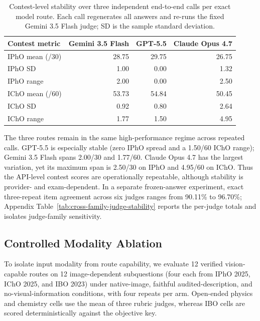 \documentclass[11pt]{article}
\begin{document}
\begin{table}[t]
\centering
\scriptsize
\setlength{\tabcolsep}{4.2pt}
\begin{tabular}{l r r r}
\toprule
\textbf{Contest metric} & \textbf{Gemini 3.5 Flash} & \textbf{GPT-5.5} & \textbf{Claude Opus 4.7} \\
\midrule
IPhO mean (/30) & 28.75 & 29.75 & 26.75 \\
IPhO SD & 1.00 & 0.00 & 1.32 \\
IPhO range & 2.00 & 0.00 & 2.50 \\
\midrule
IChO mean (/60) & 53.73 & 54.84 & 50.45 \\
IChO SD & 0.92 & 0.80 & 2.64 \\
IChO range & 1.77 & 1.50 & 4.95 \\
\bottomrule
\end{tabular}
\caption{Contest-level stability over three independent end-to-end calls per exact model route. Each call regenerates all answers and re-runs the fixed Gemini 3.5 Flash judge; SD is the sample standard deviation.}
\label{tab:fresh-2026-run-stability}
\vspace{-0.3cm}
\end{table}

The three routes remain in the same high-performance regime across repeated calls. GPT-5.5 is especially stable (zero IPhO spread and a 1.50/60 IChO range); Gemini 3.5 Flash spans 2.00/30 and 1.77/60. Claude Opus 4.7 has the largest variation, yet its maximum span is 2.50/30 on IPhO and 4.95/60 on IChO. Thus the API-level contest scores are operationally repeatable, although stability is provider- and exam-dependent. In a separate frozen-answer experiment, exact three-repeat item agreement across six judges ranges from 90.11\% to 96.70\%; Appendix Table~\ref{tab:cross-family-judge-stability} reports the per-judge totals and isolates judge-family sensitivity.

\subsection{Controlled Modality Ablation}
To isolate input modality from route capability, we evaluate 12 verified vision-capable routes on 12 image-dependent subquestions (four each from IPhO 2025, IChO 2025, and IBO 2023) under native-image, faithful audited-description, and no-visual-information conditions, with four repeats per arm.
Open-ended physics and chemistry cells use the mean of three rubric judges, whereas IBO cells are scored deterministically against the objective key.
\end{document}
